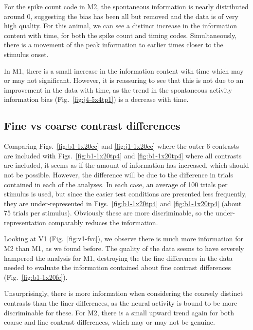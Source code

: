 For the spike count code in \ac{M2}, the spontaneous information is nearly distributed around 0, suggesting the bias has been all but removed and the data is of very high quality.
For this animal, we can see a distinct increase in the information content with time, for both the spike count and timing codes.
Simultaneously, there is a movement of the peak information to earlier times closer to the stimulus onset.

In \ac{M1}, there is a small increase in the information content with time which may or may not significant.
However, it is reassuring to see that this is not due to an improvement in the data with time, as the trend in the spontaneous activity information bias (Fig.~\ref{fig:j4-5x4tp1}) is a decrease with time.

\FloatBarrier
\subsection{Fine vs coarse contrast differences}

Comparing Figs.~\ref{fig:b1-1x20cc} and \ref{fig:j1-1x20cc} where the outer 6 contrasts are included with Figs.~\ref{fig:b1-1x20tp4} and \ref{fig:b1-1x20tp4} where all contrasts are included, it seems as if the amount of information has increased, which should not be possible.
However, the difference will be due to the difference in trials contained in each of the analyses.
In each case, an average of 100 trials per stimulus is used, but since the easier test conditions are presented less frequently, they are under-represented in Figs.~\ref{fig:b1-1x20tp4} and \ref{fig:b1-1x20tp4} (about 75 trials per stimulus).
Obviously these are more discriminable, so the under-representation comparably reduces the information.

Looking at \ac{V1} (Fig.~\ref{fig:v1-fvc}), we observe there is much more information for \ac{M2} than \ac{M1}, as we found before.
The quality of the data seems to have severely hampered the analysis for \ac{M1}, destroying the the fine differences in the data needed to evaluate the information contained about fine contrast differences (Fig.~\ref{fig:b1-1x20fc}).

Unsurprisingly, there is more information when considering the coarsely distinct contrasts than the finer differences, as the neural activity is bound to be more discriminable for these.
For \ac{M2}, there is a small upward trend again for both coarse and fine contrast differences, which may or may not be genuine.

